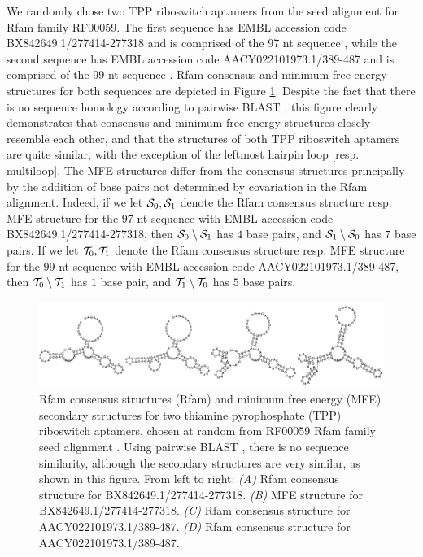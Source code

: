 We randomly chose two TPP riboswitch
aptamers from the seed alignment for
Rfam family RF00059. The first sequence has EMBL accession code
BX842649.1/277414-277318 and is comprised of the 97 nt sequence
, while the second sequence
has EMBL accession code AACY022101973.1/389-487 and is comprised of the 99
nt sequence
.
Rfam consensus and minimum free energy structures for both sequences are
depicted in Figure \ref{fig:fftbor:tppConsensusAndMfe}.
Despite the fact that there is no sequence homology according to
pairwise BLAST \cite{BLAST}, this figure clearly demonstrates that
consensus and
minimum free energy structures closely resemble each other, and that the
structures of both TPP riboswitch aptamers are quite similar, with the
exception of the leftmost hairpin loop [resp. multiloop].
The MFE structures differ
from the consensus structures principally by the addition of base pairs not
determined by covariation in the Rfam alignment.
Indeed, if we let $\mathcal S_0,\mathcal S_1$
denote the Rfam consensus structure resp. MFE structure for the 97 nt
sequence with EMBL accession code BX842649.1/277414-277318, then
$\mathcal S_0 \setminus \mathcal S_1$ has $4$ base pairs, and $\mathcal S_1 \setminus \mathcal S_0$
 has $7$
base pairs. If we let $\mathcal T_0,\mathcal T_1$
denote the Rfam consensus structure resp. MFE structure for the 99 nt
sequence with EMBL accession code
AACY022101973.1/389-487, then
$\mathcal T_0 \setminus \mathcal T_1$ has $1$ base pair, and $\mathcal T_1 \setminus \mathcal T_0$ has $5$
base pairs.

\begin{figure}[!h]
\centering
\includegraphics[width=\textwidth]{Figures/FFTbor/tppConsensusAndMfe.pdf}
\caption{Rfam consensus structures (Rfam) and minimum free energy (MFE)
secondary structures for two thiamine pyrophosphate (TPP) riboswitch aptamers,
chosen at random from RF00059 Rfam family seed alignment
\cite{Gardner.nar11}. Using pairwise BLAST \cite{BLAST}, there is no
sequence similarity, although the secondary structures are very similar,
as shown in this figure. From left to right:
{\em (A)} Rfam consensus structure for BX842649.1/277414-277318.
{\em (B)} MFE structure for BX842649.1/277414-277318.
{\em (C)} Rfam consensus structure for AACY022101973.1/389-487.
{\em (D)} Rfam consensus structure for AACY022101973.1/389-487.
}
\label{fig:fftbor:tppConsensusAndMfe}
\end{figure}

